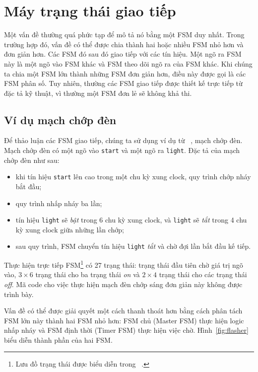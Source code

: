 \documentclass[%
    10pt,
    headinclude, footexclude,
    openright, %
    notitlepage,
    cleardoubleempty,
    headsepline,
    pointlessnumbers,
    bibtotoc, idxtotoc,
    ]{scrbook}
\newcommand{\code}[1]{{\small{\texttt{#1}}}}
\newcommand{\todo}[1]{{\emph{TODO: #1}}}
\renewcommand{\todo}[1]{}
\begin{document}
\todo{Here a more interesting exercise. And not one from Dally.}

\chapter{Máy trạng thái giao tiếp}

Một vấn đề thường quá phức tạp để mô tả nó bằng một FSM duy nhất. Trong trường hợp đó, vấn đề có thể được chia thành hai hoặc nhiều FSM nhỏ hơn và đơn giản hơn. Các FSM đó sau đó giao tiếp với các tín hiệu. Một ngõ ra FSM này là một ngõ vào FSM khác và FSM theo dõi ngõ ra của FSM khác. Khi chúng ta chia một FSM lớn thành những FSM đơn giản hơn, điều này được gọi là các FSM phân số. Tuy nhiên, thường các FSM giao tiếp được thiết kế trực tiếp từ đặc tả kỹ thuật, vì thường một FSM đơn lẻ sẽ không khả thi. 

\section{Ví dụ mạch chớp đèn}

Để thảo luận các FSM giao tiếp, chúng ta sử dụng ví dụ từ ~\cite[Chương~17]{dally:vhdl:2016}, mạch chớp đèn.
Mạch chớp đèn có một ngõ vào \code{start} và một ngõ ra \code{light}. Đặc tả của mạch chớp đèn như sau:
\begin{itemize}
\item khi tín hiệu \code{start} lên cao trong một chu kỳ xung clock, quy trình chớp nháy bắt đầu;
\item quy trình nhấp nháy ba lần;
\item tín hiệu \code{light} sẽ \emph{bật} trong 6 chu kỳ xung clock, và \code{light} sẽ \emph{tắt} trong 4 chu kỳ xung clock giữa những lần chớp;
\item sau quy trình, FSM chuyển tín hiệu \code{light} \emph{tắt} và chờ đợi lần bắt đầu kế tiếp.
\end{itemize}

Thực hiện trực tiếp FSM\footnote{Lưu đồ trạng thái được biểu diễn trong ~\cite[p.~376]{dally:vhdl:2016}.} có 27 trạng thái:
trạng thái đầu tiên chờ giá trị ngõ vào, $3 \times 6$ trạng thái cho ba trạng thái \emph{on} và $2 \times 4$ trạng thái cho các trạng thái \emph{off}.
Mã code cho việc thực hiện mạch đèn chớp sáng đơn giản này không được trình bày. 

Vấn đề có thể được giải quyết một cách thanh thoát hơn bằng cách phân tách FSM lớn này thành hai FSM nhỏ hơn: FSM chủ (Master FSM) thực hiện logic nhấp nháy và FSM định thời (Timer FSM) thực hiện việc chờ. Hình~\ref{fig:flasher} biểu diễn thành phần của hai FSM. 
\end{document}
